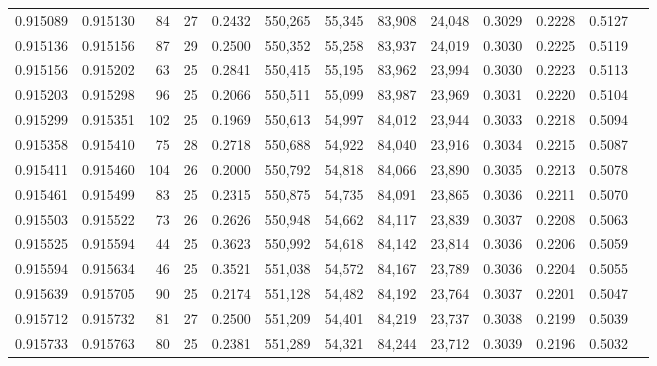 \begin{tabular}{rrrrrrrrrrrrr}
0.915089 & 0.915130 &    84 &  27 &                                     0.2432 & 550,265 &  55,345 &  83,908 &  24,048 & 0.3029 & 0.2228 & 0.5127 \\
0.915136 & 0.915156 &    87 &  29 &                                     0.2500 & 550,352 &  55,258 &  83,937 &  24,019 & 0.3030 & 0.2225 & 0.5119 \\
0.915156 & 0.915202 &    63 &  25 &                                     0.2841 & 550,415 &  55,195 &  83,962 &  23,994 & 0.3030 & 0.2223 & 0.5113 \\
0.915203 & 0.915298 &    96 &  25 &                                     0.2066 & 550,511 &  55,099 &  83,987 &  23,969 & 0.3031 & 0.2220 & 0.5104 \\
0.915299 & 0.915351 &   102 &  25 &                                     0.1969 & 550,613 &  54,997 &  84,012 &  23,944 & 0.3033 & 0.2218 & 0.5094 \\
0.915358 & 0.915410 &    75 &  28 &                                     0.2718 & 550,688 &  54,922 &  84,040 &  23,916 & 0.3034 & 0.2215 & 0.5087 \\
0.915411 & 0.915460 &   104 &  26 &                                     0.2000 & 550,792 &  54,818 &  84,066 &  23,890 & 0.3035 & 0.2213 & 0.5078 \\
0.915461 & 0.915499 &    83 &  25 &                                     0.2315 & 550,875 &  54,735 &  84,091 &  23,865 & 0.3036 & 0.2211 & 0.5070 \\
0.915503 & 0.915522 &    73 &  26 &                                     0.2626 & 550,948 &  54,662 &  84,117 &  23,839 & 0.3037 & 0.2208 & 0.5063 \\
0.915525 & 0.915594 &    44 &  25 &                                     0.3623 & 550,992 &  54,618 &  84,142 &  23,814 & 0.3036 & 0.2206 & 0.5059 \\
0.915594 & 0.915634 &    46 &  25 &                                     0.3521 & 551,038 &  54,572 &  84,167 &  23,789 & 0.3036 & 0.2204 & 0.5055 \\
0.915639 & 0.915705 &    90 &  25 &                                     0.2174 & 551,128 &  54,482 &  84,192 &  23,764 & 0.3037 & 0.2201 & 0.5047 \\
0.915712 & 0.915732 &    81 &  27 &                                     0.2500 & 551,209 &  54,401 &  84,219 &  23,737 & 0.3038 & 0.2199 & 0.5039 \\
0.915733 & 0.915763 &    80 &  25 &                                     0.2381 & 551,289 &  54,321 &  84,244 &  23,712 & 0.3039 & 0.2196 & 0.5032 \\

\end{tabular}
